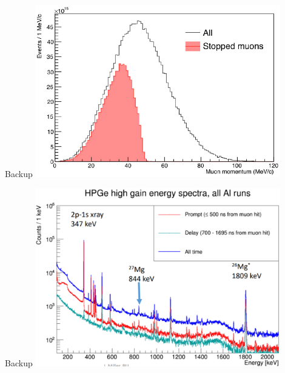 \documentclass[10pt]{beamer}
\begin{document}
\begin{frame}{Backup}
\centering
\includegraphics[width=0.8\textwidth]{stopped_muons}
\end{frame}


\begin{frame}{Backup}
\centering
\includegraphics[width=0.8\textwidth]{HPG_Spectra}
\end{frame}
\end{document}
